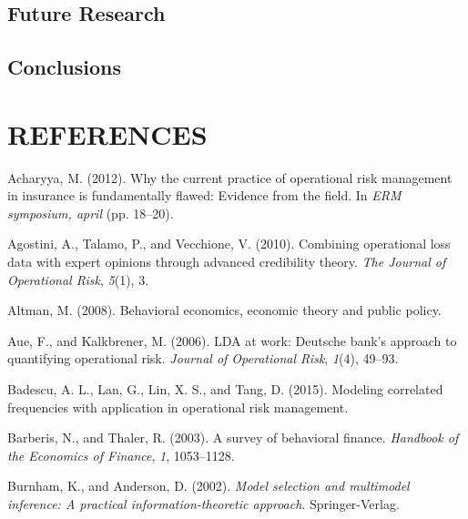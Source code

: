 \documentclass[]{DissertateUSU}
\begin{document}
\section{Future Research}\label{future-research}

\section{Conclusions}\label{conclusions-1}

\singlespacing

\FloatBarrier

\newpage

 \fancyhead[R]{\thepage} \fancyfoot[C]{}

\chapter*{REFERENCES}

\setlength{\parindent}{-0.5in} \setlength{\leftskip}{0.4in}
\setlength{\parskip}{6pt} \noindent

\hypertarget{refs}{}
\hypertarget{ref-acharyya2012current}{}
Acharyya, M. (2012). Why the current practice of operational risk
management in insurance is fundamentally flawed: Evidence from the
field. In \emph{ERM symposium, april} (pp. 18--20).

\hypertarget{ref-agostini2010combining}{}
Agostini, A., Talamo, P., and Vecchione, V. (2010). Combining
operational loss data with expert opinions through advanced credibility
theory. \emph{The Journal of Operational Risk}, \emph{5}(1), 3.

\hypertarget{ref-altman2008behavioral}{}
Altman, M. (2008). Behavioral economics, economic theory and public
policy.

\hypertarget{ref-aue2006lda}{}
Aue, F., and Kalkbrener, M. (2006). LDA at work: Deutsche bank's
approach to quantifying operational risk. \emph{Journal of Operational
Risk}, \emph{1}(4), 49--93.

\hypertarget{ref-badescu2015modeling}{}
Badescu, A. L., Lan, G., Lin, X. S., and Tang, D. (2015). Modeling
correlated frequencies with application in operational risk management.

\hypertarget{ref-barberis2003survey}{}
Barberis, N., and Thaler, R. (2003). A survey of behavioral finance.
\emph{Handbook of the Economics of Finance}, \emph{1}, 1053--1128.

\hypertarget{ref-Burnham2002}{}
Burnham, K., and Anderson, D. (2002). \emph{Model selection and
multimodel inference: A practical information-theoretic approach}.
Springer-Verlag.
\end{document}
